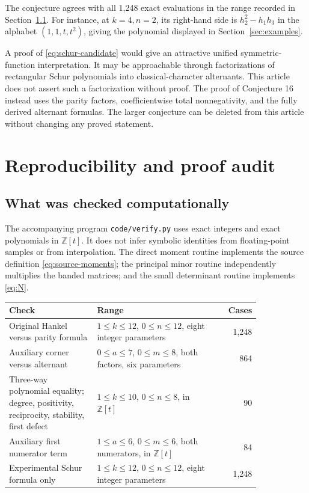 \documentclass[11pt]{article}
\theoremstyle{definition}
\theoremstyle{remark}
\newcommand{\Z}{\mathbb Z}
\numberwithin{equation}{section}
\begin{document}
The conjecture agrees with all 1,248 exact evaluations in the range recorded
in Section~\ref{sec:verify}. For instance, at $k=4,n=2$, its right-hand
side is $h_2^2-h_1h_3$ in the alphabet $(1,1,t,t^2)$, giving the
polynomial displayed in Section~\ref{sec:examples}.

A proof of \eqref{eq:schur-candidate} would give an attractive unified
symmetric-function interpretation. It may be approachable through
factorizations of rectangular Schur polynomials into classical-character
alternants. This article does not assert such a factorization without
proof. The proof of Conjecture 16 instead uses the parity factors,
coefficientwise total nonnegativity, and the fully derived alternant
formulas. The larger conjecture can be deleted from this article without
changing any proved statement.

\section{Reproducibility and proof audit}
\label{sec:audit}

\subsection{What was checked computationally}
\label{sec:verify}
The accompanying program \texttt{code/verify.py} uses exact integers and
exact polynomials in $\Z[t]$. It does not infer symbolic identities from
floating-point samples or from interpolation. The direct moment routine
implements the source definition \eqref{eq:source-moments}; the principal
minor routine independently multiplies the banded matrices; and the small
determinant routine implements \eqref{eq:N}.

\begin{center}
\small
\begin{tabular}{@{}p{0.35\linewidth}p{0.48\linewidth}r@{}}
\toprule
Check & Range & Cases\\
\midrule
Original Hankel versus parity formula &
$1\le k\le12$, $0\le n\le12$, eight integer parameters & 1,248\\[3pt]
Auxiliary corner versus alternant &
$0\le a\le7$, $0\le m\le8$, both factors, six parameters & 864\\[3pt]
Three-way polynomial equality; degree, positivity, reciprocity,
stability, first defect & $1\le k\le10$, $0\le n\le8$, in $\Z[t]$ & 90\\[3pt]
Auxiliary first numerator term &
$1\le a\le6$, $0\le m\le6$, both numerators, in $\Z[t]$ & 84\\[3pt]
Experimental Schur formula only &
$1\le k\le12$, $0\le n\le12$, eight integer parameters & 1,248\\
\bottomrule
\end{tabular}
\end{center}
\end{document}
